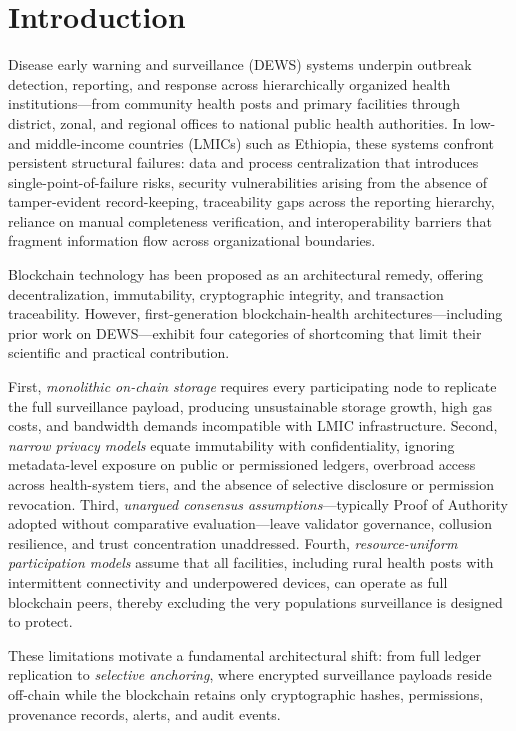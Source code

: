 \section{Introduction}\label{sec:introduction}

Disease early warning and surveillance (DEWS) systems underpin outbreak detection, reporting, and response across hierarchically organized health institutions---from community health posts and primary facilities through district, zonal, and regional offices to national public health authorities. In low- and middle-income countries (LMICs) such as Ethiopia, these systems confront persistent structural failures: data and process centralization that introduces single-point-of-failure risks, security vulnerabilities arising from the absence of tamper-evident record-keeping, traceability gaps across the reporting hierarchy, reliance on manual completeness verification, and interoperability barriers that fragment information flow across organizational boundaries.

Blockchain technology has been proposed as an architectural remedy, offering decentralization, immutability, cryptographic integrity, and transaction traceability.\cite{yaga2018blockchain} However, first-generation blockchain-health architectures---including prior work on DEWS---exhibit four categories of shortcoming that limit their scientific and practical contribution.

First, \emph{monolithic on-chain storage} requires every participating node to replicate the full surveillance payload, producing unsustainable storage growth, high gas costs, and bandwidth demands incompatible with LMIC infrastructure.\cite{kelly2019key} Second, \emph{narrow privacy models} equate immutability with confidentiality, ignoring metadata-level exposure on public or permissioned ledgers, overbroad access across health-system tiers, and the absence of selective disclosure or permission revocation.\cite{finlayson2019adversarial} Third, \emph{unargued consensus assumptions}---typically Proof of Authority adopted without comparative evaluation---leave validator governance, collusion resilience, and trust concentration unaddressed.\cite{bohme2015building} Fourth, \emph{resource-uniform participation models} assume that all facilities, including rural health posts with intermittent connectivity and underpowered devices, can operate as full blockchain peers, thereby excluding the very populations surveillance is designed to protect.

These limitations motivate a fundamental architectural shift: from full ledger replication to \emph{selective anchoring}, where encrypted surveillance payloads reside off-chain while the blockchain retains only cryptographic hashes, permissions, provenance records, alerts, and audit events.

